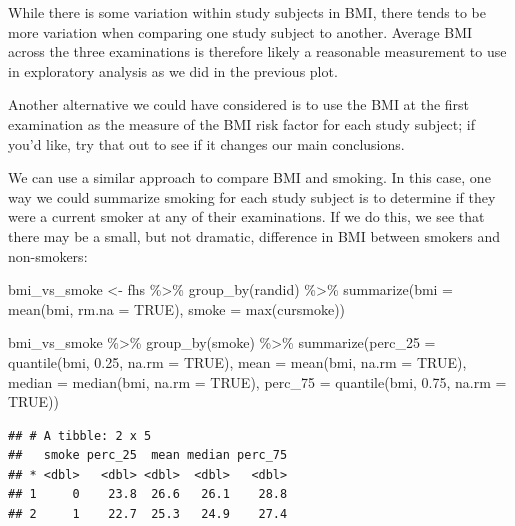 \documentclass[
]{book}
\newenvironment{Shaded}{\begin{snugshade}}{\end{snugshade}}
\newcommand{\AttributeTok}[1]{\textcolor[rgb]{0.77,0.63,0.00}{#1}}
\newcommand{\ConstantTok}[1]{\textcolor[rgb]{0.00,0.00,0.00}{#1}}
\newcommand{\FloatTok}[1]{\textcolor[rgb]{0.00,0.00,0.81}{#1}}
\newcommand{\FunctionTok}[1]{\textcolor[rgb]{0.00,0.00,0.00}{#1}}
\newcommand{\NormalTok}[1]{#1}
\newcommand{\OtherTok}[1]{\textcolor[rgb]{0.56,0.35,0.01}{#1}}
\newcommand{\SpecialCharTok}[1]{\textcolor[rgb]{0.00,0.00,0.00}{#1}}
\begin{document}
While there is some variation within study subjects in BMI, there tends to be more variation when comparing one study subject to another. Average BMI across the three examinations is therefore likely a reasonable measurement to use in exploratory analysis as we did in the previous plot.

Another alternative we could have considered is to use the BMI at the first examination as the measure of the BMI risk factor for each study subject; if you'd like, try that out to see if it changes our main conclusions.

We can use a similar approach to compare BMI and smoking. In this case, one way we could summarize smoking for each study subject is to determine if they were a current smoker at any of their examinations. If we do this, we see that there may be a small, but not dramatic, difference in BMI between smokers and non-smokers:

\begin{Shaded}
\begin{Highlighting}[]
\NormalTok{bmi\_vs\_smoke }\OtherTok{\textless{}{-}}\NormalTok{ fhs }\SpecialCharTok{\%\textgreater{}\%} 
  \FunctionTok{group\_by}\NormalTok{(randid) }\SpecialCharTok{\%\textgreater{}\%} 
  \FunctionTok{summarize}\NormalTok{(}\AttributeTok{bmi =} \FunctionTok{mean}\NormalTok{(bmi, }\AttributeTok{rm.na =} \ConstantTok{TRUE}\NormalTok{), }
            \AttributeTok{smoke =} \FunctionTok{max}\NormalTok{(cursmoke))}

\NormalTok{bmi\_vs\_smoke }\SpecialCharTok{\%\textgreater{}\%} 
  \FunctionTok{group\_by}\NormalTok{(smoke) }\SpecialCharTok{\%\textgreater{}\%} 
  \FunctionTok{summarize}\NormalTok{(}\AttributeTok{perc\_25 =} \FunctionTok{quantile}\NormalTok{(bmi, }\FloatTok{0.25}\NormalTok{, }\AttributeTok{na.rm =} \ConstantTok{TRUE}\NormalTok{), }
            \AttributeTok{mean =} \FunctionTok{mean}\NormalTok{(bmi, }\AttributeTok{na.rm =} \ConstantTok{TRUE}\NormalTok{), }
            \AttributeTok{median =} \FunctionTok{median}\NormalTok{(bmi, }\AttributeTok{na.rm =} \ConstantTok{TRUE}\NormalTok{),}
            \AttributeTok{perc\_75 =} \FunctionTok{quantile}\NormalTok{(bmi, }\FloatTok{0.75}\NormalTok{, }\AttributeTok{na.rm =} \ConstantTok{TRUE}\NormalTok{)) }
\end{Highlighting}
\end{Shaded}

\begin{verbatim}
## # A tibble: 2 x 5
##   smoke perc_25  mean median perc_75
## * <dbl>   <dbl> <dbl>  <dbl>   <dbl>
## 1     0    23.8  26.6   26.1    28.8
## 2     1    22.7  25.3   24.9    27.4
\end{verbatim}
\end{document}
